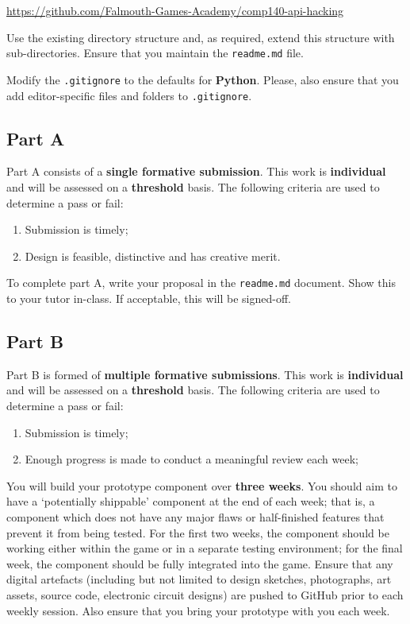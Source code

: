 \documentclass{../fal_assignment}
\begin{document}
\indent \url{https://github.com/Falmouth-Games-Academy/comp140-api-hacking }

Use the existing directory structure and, as required, extend this structure with sub-directories. Ensure that you maintain the \texttt{readme.md} file.

Modify the \texttt{.gitignore} to the defaults for \textbf{Python}. Please, also ensure that you add editor-specific files and folders to \texttt{.gitignore}. 

\subsection*{Part A}

Part A consists of a \textbf{single formative submission}. This work is \textbf{individual} and will be assessed on a \textbf{threshold} basis. The following criteria are used to determine a pass or fail:

\begin{enumerate}[label=(\alph*)]
	\item Submission is timely;
	\item Design is feasible, distinctive and has creative merit.
\end{enumerate}

To complete part A, write your proposal in the \texttt{readme.md} document. Show this to your tutor in-class. If acceptable, this will be signed-off.

\subsection*{Part B}

Part B is formed of \textbf{multiple formative submissions}. This work is \textbf{individual} and will be assessed on a \textbf{threshold} basis. The following criteria are used to determine a pass or fail:

\begin{enumerate}[label=(\alph*)]
	\item Submission is timely;
	\item Enough progress is made to conduct a meaningful review each week;
\end{enumerate}

You will build your prototype component over \textbf{three weeks}. You should aim to have a `potentially shippable' component at the end of each week; that is, a component which does not have any major flaws or half-finished features that prevent it from being tested. For the first two weeks, the component should be working either within the game or in a separate testing environment; for the final week, the component should be fully integrated into the game. Ensure that any digital artefacts (including but not limited to design sketches, photographs, art assets, source code, electronic circuit designs) are pushed to GitHub prior to each weekly session. Also ensure that you bring your prototype with you each week. 
\end{document}
